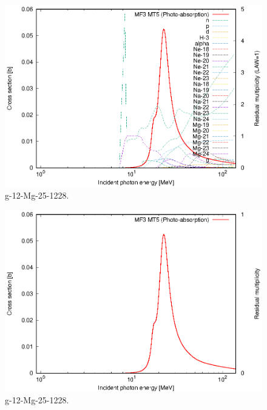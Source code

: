 \begin{figure}
 \includegraphics[width=\linewidth]{eps/g_12-Mg-25_1228.eps}
  \caption{g-12-Mg-25-1228.}
\end{figure}
\begin{figure}
 \includegraphics[width=\linewidth]{eps-law0/g_12-Mg-25_1228.eps}
 \caption{g-12-Mg-25-1228.}
\end{figure}
\newpage \clearpage

